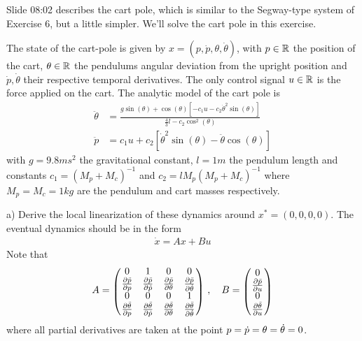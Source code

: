 

\renewcommand{\course}{Robotics}
\renewcommand{\coursepicture}{roboticsLecture}
\renewcommand{\coursedate}{Winter 2014}
\renewcommand{\exnum}{11}

\exercises


\exercisestitle



Slide 08:02 describes the cart pole, which is similar to the
Segway-type system of Exercise 6, but a little simpler. We'll solve
the cart pole in this exercise.

The state of the cart-pole is given by $x = (p,\dot p,
\theta,\dot\theta)$, with $p\in{\mathbb{R}}$ the position of the cart,
$\theta\in{\mathbb{R}}$ the pendulums angular deviation from the upright
position and $\dot p,\dot \theta$ their respective temporal
derivatives. The only control signal $u\in{\mathbb{R}}$ is the force applied on the
cart. The analytic model of the cart pole is
\begin{align}
\ddot\theta
 &= \frac{g\sin(\theta) + \cos(\theta)
         \left[-c_1 u - c_2\dot{\theta}^2\sin(\theta)\right]}
    {\frac{4}{3}l - c_2\cos^2(\theta)}\\
\ddot p
 &= c_1 u
  + c_2 \left[\dot\theta^2\sin(\theta) - \ddot\theta\cos(\theta)\right]
\end{align}
with $g = 9.8ms^2$ the gravitational constant, $l = 1m$ the pendulum
length and constants $c_1 = (M_p + M_c)^{-1}$ and $c_2 = l M_p(M_p +
M_c)^{-1}$ where $M_p = M_c = 1kg$ are the pendulum and cart masses
respectively.


a) Derive the local linearization of these dynamics around
$x^*=(0,0,0,0)$. The eventual dynamics should be in the form
\begin{align*}
\dot x = A x + B u
\end{align*}
Note that
\begin{align*}
A = \mat{cccc}{0 & 1 & 0 & 0 \\
 \frac{\del\ddot p}{\del p} & \frac{\del\ddot p}{\del\dot p} &
 \frac{\del\ddot p}{\del\t} & \frac{\del\ddot p}{\del\dot\t} \\
 0 & 0 & 0 & 1 \\
 \frac{\del\ddot \t}{\del p} & \frac{\del\ddot \t}{\del\dot p} &
 \frac{\del\ddot \t}{\del\t} & \frac{\del\ddot \t}{\del\dot\t} }
\comma
B = \mat{c}{0 \\
\frac{\del\ddot p}{\del u} \\
0 \\
\frac{\del\ddot\t}{\del u}}
\end{align*}
where all partial derivatives are taken at the point $p=\dot
p=\theta=\dot{\theta}=0$.

